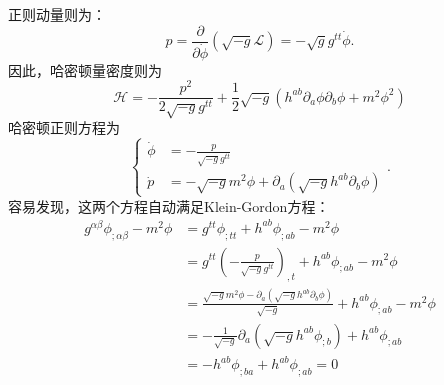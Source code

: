 \documentclass[hyperref, UTF8, a4paper]{ctexart}
\begin{document}
正则动量则为：
\begin{equation*}
	p=\frac{\partial }{\partial \dot{\phi }}\left(\sqrt{-g}\mathcal{L}\right) =-\sqrt{g} g^{tt}\dot{\phi } .
\end{equation*}
因此，哈密顿量密度则为
\begin{equation*}
	\mathcal{H} =-\frac{p^{2}}{2\sqrt{-g} g^{tt}} +\frac{1}{2}\sqrt{-g} (h^{ab} \partial _{a} \phi \partial _{b} \phi +m^{2} \phi ^{2} )
\end{equation*}
哈密顿正则方程为
\begin{equation*}
	\begin{cases}
		\dot{\phi } & =-\frac{p}{\sqrt{-g} g^{tt}}\\
		\dot{p} & =-\sqrt{-g} m^{2} \phi +\partial _{a} (\sqrt{-g} h^{ab} \partial _{b} \phi )
	\end{cases} .
\end{equation*}
容易发现，这两个方程自动满足Klein-Gordon方程：
\begin{equation*}
	\begin{aligned}
		g^{\alpha \beta } \phi _{;\alpha \beta } -m^{2} \phi  & =g^{tt} \phi _{;tt} +h^{ab} \phi _{;ab} -m^{2} \phi \\
		& =g^{tt}\left( -\frac{p}{\sqrt{-g} g^{tt}}\right)_{,t} +h^{ab} \phi _{;ab} -m^{2} \phi \\
		& =\frac{\sqrt{-g} m^{2} \phi -\partial _{a}\left(\sqrt{-g} h^{ab} \partial _{b} \phi \right)}{\sqrt{-g}} +h^{ab} \phi _{;ab} -m^{2} \phi \\
		& =-\frac{1}{\sqrt{-g}} \partial _{a}\left(\sqrt{-g} h^{ab} \phi _{;b}\right) +h^{ab} \phi _{;ab}\\
		& =-h^{ab} \phi _{;ba} +h^{ab} \phi _{;ab} =0
	\end{aligned}
\end{equation*}
\end{document}
